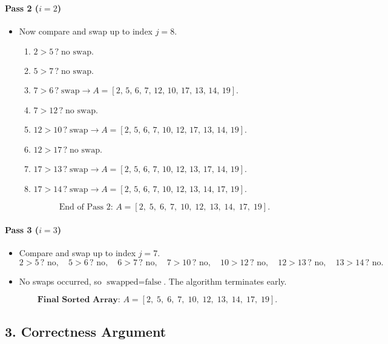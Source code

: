 \documentclass{article}
\theoremstyle{remark}
\begin{document}
\paragraph{Pass 2 (\(i = 2\))}
\begin{itemize}
  \item Now compare and swap up to index \(j = 8\).
  \begin{enumerate}
    \item \(2 > 5\,?\;\text{no swap}.\)
    \item \(5 > 7\,?\;\text{no swap}.\)
    \item \(7 > 6\,?\;\text{swap}\rightarrow A=[2,\,5,\,6,\,7,\,12,\,10,\,17,\,13,\,14,\,19].\)
    \item \(7 > 12\,?\;\text{no swap}.\)
    \item \(12 > 10\,?\;\text{swap}\rightarrow A=[2,\,5,\,6,\,7,\,10,\,12,\,17,\,13,\,14,\,19].\)
    \item \(12 > 17\,?\;\text{no swap}.\)
    \item \(17 > 13\,?\;\text{swap}\rightarrow A=[2,\,5,\,6,\,7,\,10,\,12,\,13,\,17,\,14,\,19].\)
    \item \(17 > 14\,?\;\text{swap}\rightarrow A=[2,\,5,\,6,\,7,\,10,\,12,\,13,\,14,\,17,\,19].\)
  \end{enumerate}
  \[
    \text{End of Pass 2: } A = [2,\;5,\;6,\;7,\;10,\;12,\;13,\;14,\;17,\;19].
  \]
\end{itemize}

\paragraph{Pass 3 (\(i = 3\))}
\begin{itemize}
  \item Compare and swap up to index \(j = 7\).
  \[
    2>5\,? \text{ no},\quad
    5>6\,? \text{ no},\quad
    6>7\,? \text{ no},\quad
    7>10\,? \text{ no},\quad
    10>12\,? \text{ no},\quad
    12>13\,? \text{ no},\quad
    13>14\,? \text{ no}.
  \]
  \item No swaps occurred, so \(\text{swapped} = \text{false}\). The algorithm terminates early.
\end{itemize}

\[
\textbf{Final Sorted Array: } A = [2,\;5,\;6,\;7,\;10,\;12,\;13,\;14,\;17,\;19].
\]

\subsection*{3. Correctness Argument}
\end{document}
